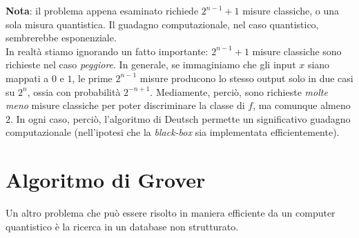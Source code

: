 \documentclass[../../InformazioneQuantistica.tex]{subfiles}
\begin{document}
\textbf{Nota}: il problema appena esaminato richiede $2^{n-1}+1$ misure classiche, o una sola misura quantistica. Il guadagno computazionale, nel caso quantistico, sembrerebbe esponenziale.\\
In realtà stiamo ignorando un fatto importante: $2^{n-1}+1$ misure classiche sono richieste nel caso \textit{peggiore}. In generale, se immaginiamo che gli input $x$ siano mappati  a $0$ e $1$, le prime $2^{n-1}$ misure producono lo stesso output solo in due casi su $2^n$, ossia con probabilità $2^{-n+1}$. Mediamente, perciò, sono richieste \textit{molte meno} misure classiche per poter discriminare la classe di $f$, ma comunque almeno $2$. In ogni caso, perciò, l'algoritmo di Deutsch permette un significativo guadagno computazionale (nell'ipotesi che la \textit{black-box} sia implementata efficientemente).

\section{Algoritmo di Grover}
Un altro problema che può essere risolto in maniera efficiente da un computer quantistico è la ricerca in un database non strutturato.\\
\end{document}
